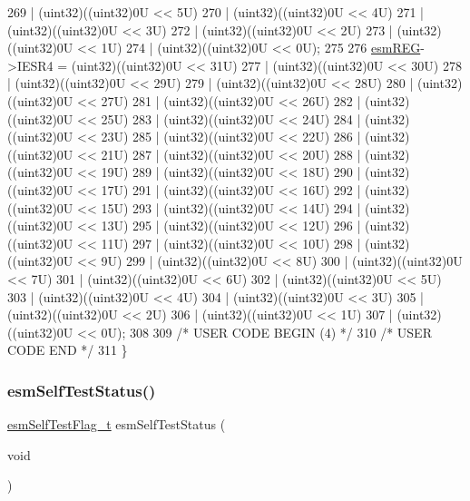 \begin{DoxyCode}
269                   | (uint32)((uint32)0U <<  5U)
270                   | (uint32)((uint32)0U <<  4U)
271                   | (uint32)((uint32)0U <<  3U)
272                   | (uint32)((uint32)0U <<  2U)
273                   | (uint32)((uint32)0U <<  1U)
274                   | (uint32)((uint32)0U <<  0U);
275 
276     \mbox{\hyperlink{reg__esm_8h_a7c2e779f2973e0c2c9496a4796df10f1}{esmREG}}->IESR4 = (uint32)((uint32)0U << 31U)
277                   | (uint32)((uint32)0U << 30U)
278                   | (uint32)((uint32)0U << 29U)
279                   | (uint32)((uint32)0U << 28U)
280                   | (uint32)((uint32)0U << 27U)
281                   | (uint32)((uint32)0U << 26U)
282                   | (uint32)((uint32)0U << 25U)
283                   | (uint32)((uint32)0U << 24U)
284                   | (uint32)((uint32)0U << 23U)
285                   | (uint32)((uint32)0U << 22U)
286                   | (uint32)((uint32)0U << 21U)
287                   | (uint32)((uint32)0U << 20U)
288                   | (uint32)((uint32)0U << 19U)
289                   | (uint32)((uint32)0U << 18U)
290                   | (uint32)((uint32)0U << 17U)
291                   | (uint32)((uint32)0U << 16U)
292                   | (uint32)((uint32)0U << 15U)
293                   | (uint32)((uint32)0U << 14U)
294                   | (uint32)((uint32)0U << 13U)
295                   | (uint32)((uint32)0U << 12U)
296                   | (uint32)((uint32)0U << 11U)
297                   | (uint32)((uint32)0U << 10U)
298                   | (uint32)((uint32)0U <<  9U)
299                   | (uint32)((uint32)0U <<  8U)
300                   | (uint32)((uint32)0U <<  7U)
301                   | (uint32)((uint32)0U <<  6U)
302                   | (uint32)((uint32)0U <<  5U)
303                   | (uint32)((uint32)0U <<  4U)
304                   | (uint32)((uint32)0U <<  3U)
305                   | (uint32)((uint32)0U <<  2U)
306                   | (uint32)((uint32)0U <<  1U)
307                   | (uint32)((uint32)0U <<  0U);
308 
309 \textcolor{comment}{/* USER CODE BEGIN (4) */}
310 \textcolor{comment}{/* USER CODE END */}
311 \}
\end{DoxyCode}
\mbox{\label{group__ESM_ga6e558e0c5761321c3419e77642795d63}} 
\subsubsection{\texorpdfstring{esm\+Self\+Test\+Status()}{esmSelfTestStatus()}}
{\footnotesize\ttfamily \mbox{\hyperlink{esm_8h_a622c861bffa9a22dacbc62fe8a2ff11f}{esm\+Self\+Test\+Flag\+\_\+t}} esm\+Self\+Test\+Status (\begin{DoxyParamCaption}\item[{void}]{ }\end{DoxyParamCaption})}




